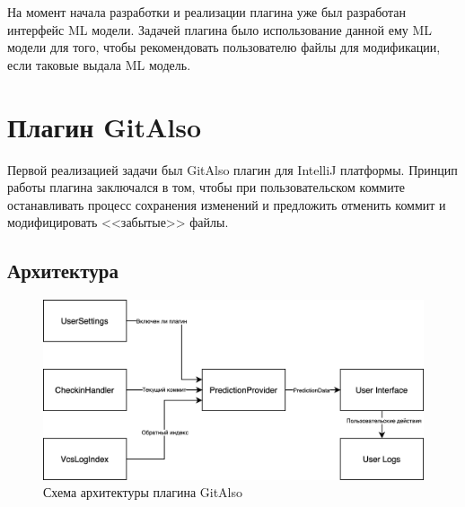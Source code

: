 На момент начала разработки и реализации плагина уже был разработан интерфейс ML модели. Задачей плагина было использование данной ему ML модели для того, чтобы рекомендовать пользователю файлы для модификации, если таковые выдала ML модель.
\section{Плагин GitAlso}
Первой реализацией задачи был GitAlso плагин для IntelliJ платформы. Принцип работы плагина заключался в том, чтобы при пользовательском коммите останавливать процесс сохранения изменений и предложить отменить коммит и модифицировать <<забытые>> файлы.
\subsection{Архитектура}
\begin{figure}[!h]
\caption{Схема архитектуры плагина GitAlso}\label{GitAlso-arch}
\centering
\includegraphics[scale=0.16]{images/GitAlsoArch.png}
\end{figure}
